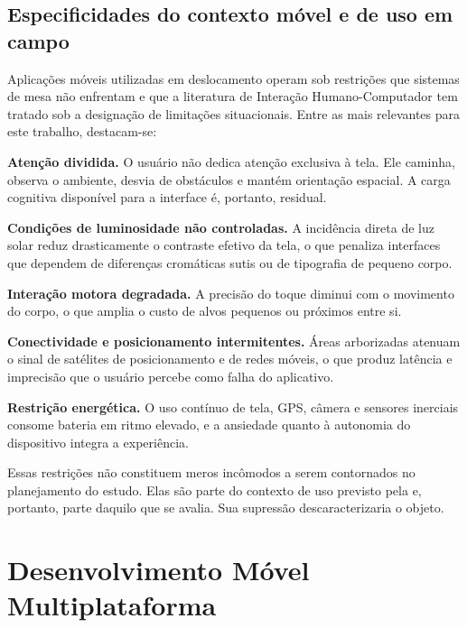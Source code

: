 \subsection{Especificidades do contexto móvel e de uso em campo}
\label{sec:contexto_movel}

Aplicações móveis utilizadas em deslocamento operam sob restrições que sistemas
de mesa não enfrentam e que a literatura de Interação Humano-Computador tem
tratado sob a designação de limitações situacionais. Entre as mais relevantes
para este trabalho, destacam-se:

\begin{alineas}
  \item \textbf{Atenção dividida.} O usuário não dedica atenção exclusiva à tela.
  Ele caminha, observa o ambiente, desvia de obstáculos e mantém orientação
  espacial. A carga cognitiva disponível para a interface é, portanto, residual.

  \item \textbf{Condições de luminosidade não controladas.} A incidência direta
  de luz solar reduz drasticamente o contraste efetivo da tela, o que penaliza
  interfaces que dependem de diferenças cromáticas sutis ou de tipografia de
  pequeno corpo.

  \item \textbf{Interação motora degradada.} A precisão do toque diminui com o
  movimento do corpo, o que amplia o custo de alvos pequenos ou próximos entre
  si.

  \item \textbf{Conectividade e posicionamento intermitentes.} Áreas arborizadas
  atenuam o sinal de satélites de posicionamento e de redes móveis, o que produz
  latência e imprecisão que o usuário percebe como falha do aplicativo.

  \item \textbf{Restrição energética.} O uso contínuo de tela, GPS, câmera e
  sensores inerciais consome bateria em ritmo elevado, e a ansiedade quanto à
  autonomia do dispositivo integra a experiência.
\end{alineas}

Essas restrições não constituem meros incômodos a serem contornados no
planejamento do estudo. Elas são parte do contexto de uso previsto pela
 e, portanto, parte daquilo que se avalia. Sua
supressão descaracterizaria o objeto.

\section{Desenvolvimento Móvel Multiplataforma}
\label{sec:mobile}

